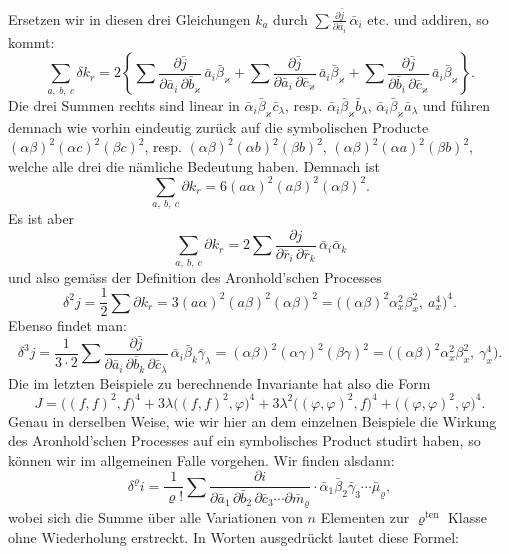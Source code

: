 \documentclass[11pt]{article}
\providecommand{\weberpage}[1]{}
\begin{document}
\weberpage{66}
Ersetzen wir in diesen drei Gleichungen $k_a$ durch $\displaystyle\sum \frac{\partial \bar j}{\partial \bar a_i}\,\bar\alpha_i$ etc. und addiren, so kommt:
\[
\sum_{a,\ b,\ c} \delta k_r = 2\left\{ \sum \frac{\partial \bar j}{\partial \bar a_i\,\partial \bar b_\varkappa}\,\bar a_i\bar\beta_\varkappa + \sum \frac{\partial \bar j}{\partial \bar a_i\,\partial \bar c_\varkappa}\,\bar a_i\bar\beta_\varkappa + \sum \frac{\partial \bar j}{\partial \bar b_i\,\partial \bar c_\varkappa}\,\bar a_i\bar\beta_\varkappa \right\}.
\]
Die drei Summen rechts sind linear in $\bar\alpha_i\bar\beta_\varkappa\bar c_\lambda$, resp. $\bar\alpha_i\bar\beta_\varkappa\bar b_\lambda$, $\bar\alpha_i\bar\beta_\varkappa\bar a_\lambda$ und führen demnach wie vorhin eindeutig zurück auf die symbolischen Producte $(\alpha\beta)^2(\alpha c)^2(\beta c)^2$, resp. $(\alpha\beta)^2(\alpha b)^2(\beta b)^2$, $(\alpha\beta)^2(\alpha a)^2(\beta b)^2$, welche alle drei die nämliche Bedeutung haben. Demnach ist
\[
\sum_{a,\ b,\ c} \partial k_r = 6(a\alpha)^2(a\beta)^2(\alpha\beta)^2.
\]
Es ist aber
\[
\sum_{a,\ b,\ c} \partial k_r = 2\sum \frac{\partial j}{\partial \bar r_i\,\partial \bar r_k}\,\bar\alpha_i\bar\alpha_k
\]
und also gemäss der Definition des Aronhold'schen Processes
\[
\delta^2 j = \frac{1}{2}\sum \partial k_r = 3(a\alpha)^2(a\beta)^2(\alpha\beta)^2 = \big((\alpha\beta)^2\alpha_x^2\beta_x^2,\ a_x^4\big)^4.
\]
Ebenso findet man:
\[
\delta^3 j = \frac{1}{3\cdot 2}\sum \frac{\partial \bar j}{\partial \bar a_i\,\partial \bar b_k\,\partial \bar c_\lambda}\,\bar\alpha_i\bar\beta_k\bar\gamma_\lambda = (\alpha\beta)^2(\alpha\gamma)^2(\beta\gamma)^2 = \big((\alpha\beta)^2\alpha_x^2\beta_x^2,\ \gamma_x^4\big).
\]
Die im letzten Beispiele zu berechnende Invariante hat also die Form
\[
J = \big((f,f)^2,f\big)^4 + 3\lambda\big((f,f)^2,\varphi\big)^4 + 3\lambda^2\big((\varphi,\varphi)^2,f\big)^4 + \big((\varphi,\varphi)^2,\varphi\big)^4.
\]
Genau in derselben Weise, wie wir hier an dem einzelnen Beispiele die Wirkung des Aronhold'schen Processes auf ein symbolisches Product studirt haben, so können wir im allgemeinen Falle vorgehen. Wir finden alsdann:
\[
\delta^\varrho i = \frac{1}{\varrho!}\sum \frac{\partial i}{\partial \bar a_1\,\partial \bar b_2\,\partial \bar c_3\cdots \partial \bar m_\varrho}\cdot \bar\alpha_1\bar\beta_2\bar\gamma_3\cdots \bar\mu_\varrho,
\]
wobei sich die Summe über alle Variationen von $n$ Elementen zur $\varrho^{\text{ten}}$ Klasse ohne Wiederholung erstreckt. In Worten ausgedrückt lautet diese Formel:
\end{document}
